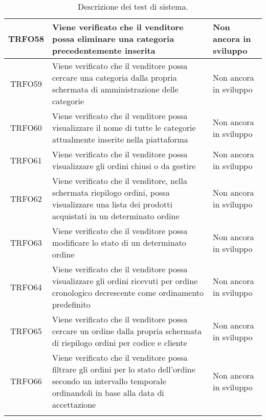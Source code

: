 \begin{longtable}{|c| C{10cm} |C{3cm}|}
   	TRFO58 & Viene verificato che il venditore possa eliminare una categoria precedentemente inserita & Non ancora in sviluppo\\ \hline
    	TRFO59 & Viene verificato che il venditore possa cercare una categoria dalla propria schermata di amministrazione delle categorie & Non ancora in sviluppo\\ \hline
	TRFO60 & Viene verificato che il venditore possa visualizzare il nome di tutte le categorie attualmente inserite nella piattaforma & Non ancora in sviluppo\\ \hline
	TRFO61 & Viene verificato che il venditore possa visualizzare gli ordini chiusi o da gestire & Non ancora in sviluppo\\ \hline
    	TRFO62 & Viene verificato che il venditore, nella schermata riepilogo ordini,  possa visualizzare una lista dei prodotti acquistati in un determinato ordine & Non ancora in sviluppo\\ \hline
    	TRFO63 & Viene verificato che il venditore possa modificare lo stato di un determinato ordine & Non ancora in sviluppo\\ \hline
	TRFO64 & Viene verificato che il venditore possa visualizzare gli ordini ricevuti per ordine cronologico decrescente come ordinamento predefinito & Non ancora in sviluppo\\ \hline
	TRFO65 & Viene verificato che il venditore possa cercare un ordine dalla propria schermata di riepilogo ordini per codice e cliente & Non ancora in sviluppo\\ \hline
    	TRFO66 & Viene verificato che il venditore possa filtrare gli ordini per lo stato dell'ordine secondo un intervallo temporale ordinandoli in base alla data di accettazione & Non ancora in sviluppo\\ 
    	\caption{Descrizione dei test di sistema.}
\end{longtable}

